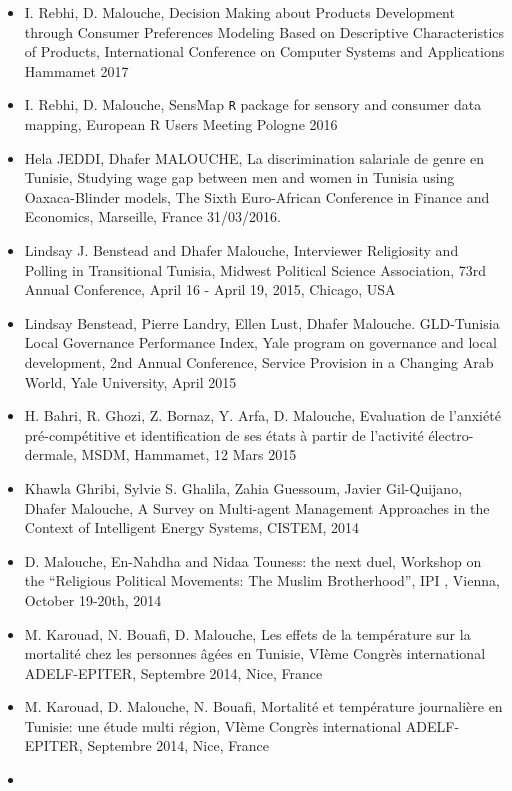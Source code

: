 \documentclass[]{article}
\begin{document}
\begin{itemize}
\item
  I. Rebhi, D. Malouche, Decision Making about Products Development
  through Consumer Preferences Modeling Based on Descriptive
  Characteristics of Products, International Conference on Computer
  Systems and Applications Hammamet 2017
\item
  I. Rebhi, D. Malouche, SensMap \texttt{R} package for sensory and
  consumer data mapping, European R Users Meeting Pologne 2016
\item
  Hela JEDDI, Dhafer MALOUCHE, La discrimination salariale de genre en
  Tunisie, Studying wage gap between men and women in Tunisia using
  Oaxaca-Blinder models, The Sixth Euro-African Conference in Finance
  and Economics, Marseille, France 31/03/2016.
\item
  Lindsay J. Benstead and Dhafer Malouche, Interviewer Religiosity and
  Polling in Transitional Tunisia, Midwest Political Science
  Association, 73rd Annual Conference, April 16 - April 19, 2015,
  Chicago, USA
\item
  Lindsay Benstead, Pierre Landry, Ellen Lust, Dhafer Malouche.
  GLD-Tunisia Local Governance Performance Index, Yale program on
  governance and local development, 2nd Annual Conference, Service
  Provision in a Changing Arab World, Yale University, April 2015
\item
  H. Bahri, R. Ghozi, Z. Bornaz, Y. Arfa, D. Malouche, Evaluation de
  l'anxiété pré-compétitive et identification de ses états à partir de
  l'activité électro-dermale, MSDM, Hammamet, 12 Mars 2015
\item
  Khawla Ghribi, Sylvie S. Ghalila, Zahia Guessoum, Javier Gil-Quijano,
  Dhafer Malouche, A Survey on Multi-agent Management Approaches in the
  Context of Intelligent Energy Systems, CISTEM, 2014
\item
  D. Malouche, En-Nahdha and Nidaa Touness: the next duel, Workshop on
  the ``Religious Political Movements: The Muslim Brotherhood'', IPI ,
  Vienna, October 19-20th, 2014
\item
  M. Karouad, N. Bouafi, D. Malouche, Les effets de la température sur
  la mortalité chez les personnes âgées en Tunisie, VIème Congrès
  international ADELF-EPITER, Septembre 2014, Nice, France
\item
  M. Karouad, D. Malouche, N. Bouafi, Mortalité et température
  journalière en Tunisie: une étude multi région, VIème Congrès
  international ADELF-EPITER, Septembre 2014, Nice, France
\item

\end{itemize}
\end{document}

